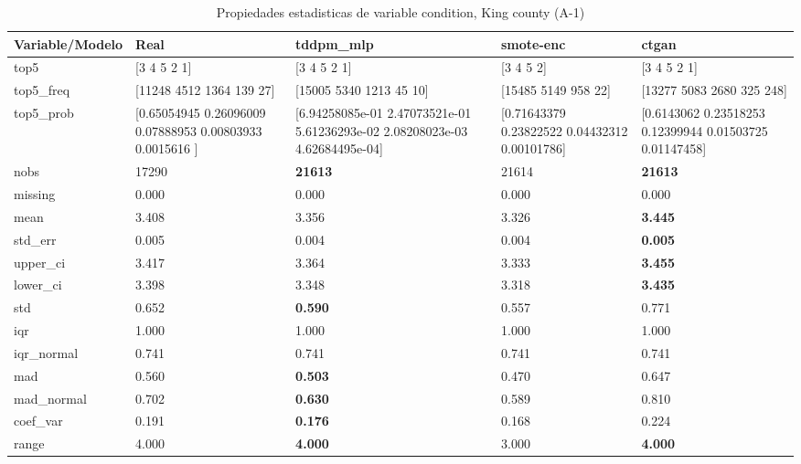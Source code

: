 \begin{table}[H]
\centering
\fontsize{8}{14}\selectfont
\caption{Propiedades  estadisticas de variable condition, King county (A-1)}
\label{table-stats-king county-a-1-condition}
\begin{tabular}{|l|m{10em}|m{10em}|m{10em}|m{10em}|}
\hline
 \rowcolor[gray]{0.8}
Variable/Modelo & Real & tddpm\_mlp & smote-enc & ctgan \\
\hline top5 & [3 4 5 2 1] & [3 4 5 2 1] & [3 4 5 2] & [3 4 5 2 1] \\
\hline top5\_freq & [11248  4512  1364   139    27] & [15005  5340  1213    45    10] & [15485  5149   958    22] & [13277  5083  2680   325   248] \\
\hline top5\_prob & [0.65054945 0.26096009 0.07888953 0.00803933 0.0015616 ] & [6.94258085e-01 2.47073521e-01 5.61236293e-02 2.08208023e-03
 4.62684495e-04] & [0.71643379 0.23822522 0.04432312 0.00101786] & [0.6143062  0.23518253 0.12399944 0.01503725 0.01147458] \\
\hline nobs & 17290 & \bfseries 21613 & \cellcolor[rgb]{0.9, 0.54, 0.52} 21614 & \bfseries 21613 \\
\hline missing & 0.000 & 0.000 & 0.000 & 0.000 \\
\hline mean & 3.408 & 3.356 & \cellcolor[rgb]{0.9, 0.54, 0.52} 3.326 & \bfseries 3.445 \\
\hline std\_err & 0.005 & 0.004 & \cellcolor[rgb]{0.9, 0.54, 0.52} 0.004 & \bfseries 0.005 \\
\hline upper\_ci & 3.417 & 3.364 & \cellcolor[rgb]{0.9, 0.54, 0.52} 3.333 & \bfseries 3.455 \\
\hline lower\_ci & 3.398 & 3.348 & \cellcolor[rgb]{0.9, 0.54, 0.52} 3.318 & \bfseries 3.435 \\
\hline std & 0.652 & \bfseries 0.590 & 0.557 & \cellcolor[rgb]{0.9, 0.54, 0.52} 0.771 \\
\hline iqr & 1.000 & 1.000 & 1.000 & 1.000 \\
\hline iqr\_normal & 0.741 & 0.741 & 0.741 & 0.741 \\
\hline mad & 0.560 & \bfseries 0.503 & \cellcolor[rgb]{0.9, 0.54, 0.52} 0.470 & 0.647 \\
\hline mad\_normal & 0.702 & \bfseries 0.630 & \cellcolor[rgb]{0.9, 0.54, 0.52} 0.589 & 0.810 \\
\hline coef\_var & 0.191 & \bfseries 0.176 & 0.168 & \cellcolor[rgb]{0.9, 0.54, 0.52} 0.224 \\
\hline range & 4.000 & \bfseries 4.000 & \cellcolor[rgb]{0.9, 0.54, 0.52} 3.000 & \bfseries 4.000 \\

\end{tabular}
\end{table}
